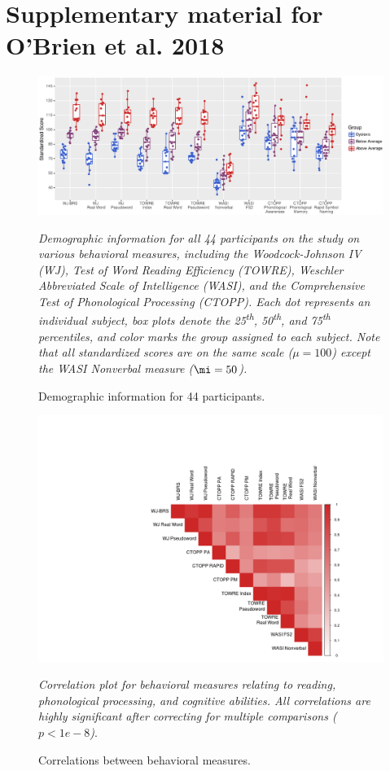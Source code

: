 \documentclass[..\uwthesis.tex]{subfiles}
\begin{document}
\chapter{Supplementary material for O'Brien et al. 2018}


\begin{figure}
    \centering
    \caption{Demographic information for 44 participants.}
    \label{fig:suppa_1}
    \includegraphics[width = 18 cm]{images/appendix_a/s1_demographics.eps}
    \item \textit{Demographic information for all 44 participants on the study on various behavioral measures, including the Woodcock-Johnson IV (WJ), Test of Word Reading Efficiency (TOWRE), Weschler Abbreviated Scale of Intelligence (WASI), and the Comprehensive Test of Phonological Processing (CTOPP). Each dot represents an individual subject, box plots denote the 25\textsuperscript{th}, 50\textsuperscript{th}, and 75\textsuperscript{th} percentiles, and color marks the group assigned to each subject. Note that all standardized scores are on the same scale ($\mu = 100$) except the WASI Nonverbal measure ($\mi = 50$).}
\end{figure}

\begin{figure}
    \centering
    \caption{Correlations between behavioral measures.}
    \label{fig:suppa_2}
    \includegraphics[width = 18 cm]{images/appendix_a/s2_corrplot.png}
    \item \textit{Correlation plot for behavioral measures relating to reading, phonological processing, and cognitive abilities. All correlations are highly significant after correcting for multiple comparisons ($p<1e-8$)}.
\end{figure}
\end{document}
